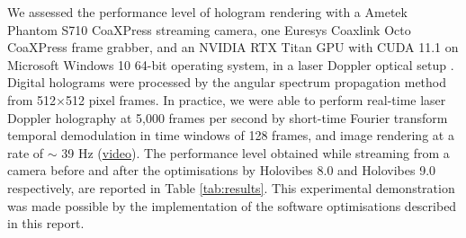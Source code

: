 


We assessed the performance level of hologram rendering with a Ametek Phantom S710 CoaXPress streaming camera, one Euresys Coaxlink Octo CoaXPress frame grabber, and an NVIDIA RTX Titan GPU with CUDA 11.1 on Microsoft Windows 10 64-bit operating system, in a laser Doppler optical setup \cite{Puyo2020Realtime}. Digital holograms were processed by the angular spectrum propagation method from 512$\times$512 pixel frames. In practice, we were able to perform real-time laser Doppler holography at 5,000 frames per second by short-time Fourier transform temporal demodulation in time windows of 128 frames, and image rendering at a rate of $\sim$ 39 Hz (\href{https://www.youtube.com/shorts/4-KwdM71jRQ}{video}). The performance level obtained while streaming from a camera before and after the optimisations by Holovibes 8.0 and Holovibes 9.0 respectively, are reported in Table \ref{tab:results}. This experimental demonstration was made possible by the implementation of the software optimisations described in this report.